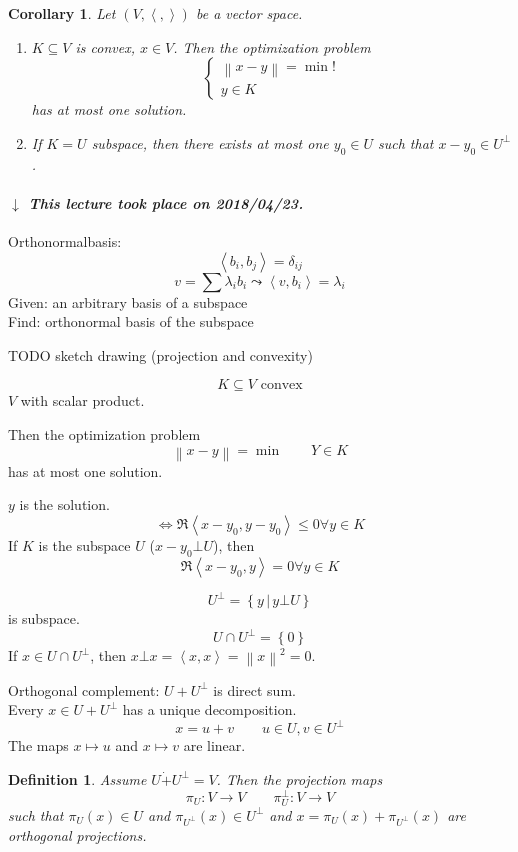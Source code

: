 \documentclass{article}
\newcounter{lecref}[section]
\numberwithin{lecref}{section}
\newtheorem{definition}[lecref]{Definition}
\newtheorem{corollary}[lecref]{Corollary}
\newcommand{\set}[1]{\left\{#1\right\}}
\newcommand{\setdef}[2]{\left\{\left.#1\,\right|\,#2\right\}}
\newcommand{\ip}[2]{\left\langle#1,#2\right\rangle} %
\newcommand{\angel}[1]{\left\langle#1\right\rangle}
\newcommand{\norm}[1]{\left\|#1\right\|}
\newcommand{\dateref}[1]{%
  \begin{mdframed}[backgroundcolor=gray!10,innerbottommargin=0pt,innertopmargin=0pt]
    \paragraph{\textit{$\downarrow$ This lecture took place on #1.}}%
  \end{mdframed}%
}
\begin{document}
\begin{corollary}
  Let $(V, \angel{,})$ be a vector space.
  \begin{enumerate}
    \item $K \subseteq V$ is convex, $x \in V$.
      Then the optimization problem
      \[
        \left\{\begin{array}{c}
          \norm{x - y} = \min! \\
          y \in K
        \end{array}\right.
      \]
      has at most one solution.
    \item If $K = U$ subspace,
      then there exists at most one $y_0 \in U$ such that $x - y_0 \in U^\bot$.
  \end{enumerate}
\end{corollary}

\dateref{2018/04/23}

Orthonormalbasis:
\[ \ip{b_i}{b_j} = \delta_{ij} \]
\[ v = \sum \lambda_i b_i \leadsto \ip{v}{b_i} = \lambda_i \]
Given: an arbitrary basis of a subspace \\
Find: orthonormal basis of the subspace

TODO sketch drawing (projection and convexity)

\[ K \subseteq V \text{ convex} \]
$V$ with scalar product.

Then the optimization problem
\[ \norm{x - y} = \min \qquad Y \in K \]
has at most one solution.

$y$ is the solution.
\[ \iff \Re\ip{x-y_0}{y - y_0} \leq 0 \forall y \in K \]
If $K$ is the subspace $U$ ($x - y_0 \bot U$), then
\[ \Re\ip{x - y_0}{y} = 0 \forall y \in K \]

\[ U^\bot = \setdef{y}{y \bot U} \]
is subspace.
\[ U \cap U^\bot = \set{0} \]
If $x \in U \cap U^\bot$, then $x \bot x = \ip{x}{x} = \norm{x}^2 = 0$.

Orthogonal complement: $U + U^\bot$ is direct sum. \\
Every $x \in U + U^\bot$ has a unique decomposition.
\[ x = u + v \qquad u \in U, v \in U^\bot \]
The maps $x \mapsto u$ and $x \mapsto v$ are linear.

\begin{definition}
  Assume $U \dot+ U^\bot = V$.
  Then the projection maps
  \[ \pi_U: V \to V \qquad \pi_U^\bot: V \to V \]
  such that $\pi_U(x) \in U$ and $\pi_{U^\bot}(x) \in U^\bot$ and $x = \pi_U(x) + \pi_{U^\bot}(x)$ are orthogonal projections.
\end{definition}
\end{document}
